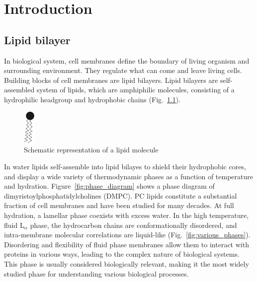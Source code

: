 \chapter{Introduction}
\section{Lipid bilayer}
In biological system, cell membranes define the boundary of living organism
and surrounding environment. They regulate what can come and leave living
cells. Building blocks of cell membranes are lipid bilayers.
Lipid bilayers are self-assembled system of lipids, which are 
amphiphilic molecules, consisting of a hydrophilic headgroup
and hydrophobic chains (Fig.~\ref{fig:lipid}).

\begin{figure}
  \centering
  \includegraphics[width=0.05\textwidth]{figures/lipid}
  \caption{Schematic representation of a lipid molecule}
  \label{fig:lipid}
\end{figure}

In water lipids self-assemble into lipid bilayes to shield their hydrophobic 
cores, and 
display a wide variety of thermodynamic phases
as a function of temperature and hydration. Figure~\ref{fig:phase_diagram}
shows a phase diagram of dimyristoylphosphatidylcholines (DMPC).
PC lipids constitute a substantial fraction of cell membranes
and have been studied for many decades.
At full hydration, a lamellar phase coexists with excess water.
In the high temperature, fluid L$_\alpha$ phase, the hydrocarbon chains 
are conformationally disordered, and intra-membrane molecular correlations 
are liquid-like \cite{ref:Fahey78} (Fig.~\ref{fig:various_phases}).
Disordering and flexibility of fluid phase membranes allow them to 
interact with proteins in various ways, leading to the complex nature
of biological systems. 
This phase is usually considered biologically relevant, making it
the most widely studied phase for understanding various biological processes.


